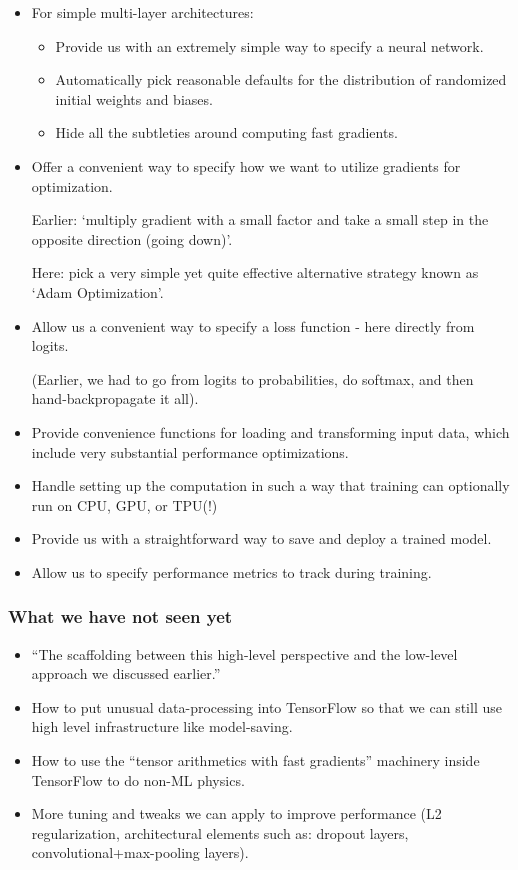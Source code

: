 \documentclass[11pt]{article}
\providecommand{\tightlist}{%
      \setlength{\itemsep}{0pt}\setlength{\parskip}{0pt}}
\begin{document}
\begin{itemize}
\item
  For simple multi-layer architectures:

  \begin{itemize}
  \tightlist
  \item
    Provide us with an extremely simple way to specify a neural network.
  \item
    Automatically pick reasonable defaults for the distribution of
    randomized initial weights and biases.
  \item
    Hide all the subtleties around computing fast gradients.
  \end{itemize}
\item
  Offer a convenient way to specify how we want to utilize gradients for
  optimization.

  Earlier: `multiply gradient with a small factor and take a small step
  in the opposite direction (going down)'.

  Here: pick a very simple yet quite effective alternative strategy
  known as `Adam Optimization'.
\item
  Allow us a convenient way to specify a loss function - here directly
  from logits.

  (Earlier, we had to go from logits to probabilities, do softmax, and
  then hand-backpropagate it all).
\item
  Provide convenience functions for loading and transforming input data,
  which include very substantial performance optimizations.
\item
  Handle setting up the computation in such a way that training can
  optionally run on CPU, GPU, or TPU(!)
\item
  Provide us with a straightforward way to save and deploy a trained
  model.
\item
  Allow us to specify performance metrics to track during training.
\end{itemize}

\hypertarget{what-we-have-not-seen-yet}{%
\subsubsection{What we have not seen
yet}\label{what-we-have-not-seen-yet}}

\begin{itemize}
\tightlist
\item
  ``The scaffolding between this high-level perspective and the
  low-level approach we discussed earlier.''
\item
  How to put unusual data-processing into TensorFlow so that we can
  still use high level infrastructure like model-saving.
\item
  How to use the ``tensor arithmetics with fast gradients'' machinery
  inside TensorFlow to do non-ML physics.
\item
  More tuning and tweaks we can apply to improve performance (L2
  regularization, architectural elements such as: dropout layers,
  convolutional+max-pooling layers).
\end{itemize}
\end{document}
